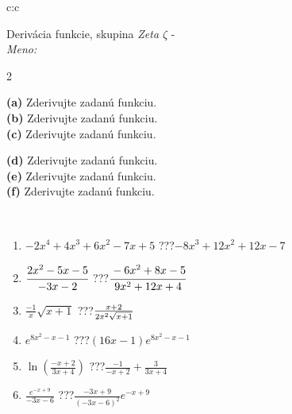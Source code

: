 \documentclass[10pt]{report}
\begin{document}
\newpage
\thispagestyle{empty}
\begin{tabular}{c:c}
\begin{minipage}[c][104.5mm][t]{0.5\linewidth}
\begin{center}
\vspace{7mm}
{\huge Derivácia funkcie, skupina \textit{Zeta $\zeta$} -}\\[5mm]
\textit{Meno:}\phantom{xxxxxxxxxxxxxxxxxxxxxxxxxxxxxxxxxxxxxxxxxxxxxxxxxxxxxxxxxxxxxxxxx}\\[5mm]
\begin{minipage}{0.95\linewidth}
\begin{center}
{\small \begin{multicols}{2} \raggedright
\textbf{(a)} Zderivujte zadanú funkciu. \\[1mm]
\textbf{(b)} Zderivujte zadanú funkciu. \\[1mm]
\textbf{(c)} Zderivujte zadanú funkciu. \par \columnbreak
\textbf{(d)} Zderivujte zadanú funkciu. \\[1mm]
\textbf{(e)} Zderivujte zadanú funkciu. \\[1mm]
\textbf{(f)} Zderivujte zadanú funkciu.
\end{multicols}
}
\end{center}
\end{minipage}
\\[4mm]
\begin{minipage}{0.79\linewidth}
\begin{center}
\begin{varwidth}{\linewidth}
\begin{enumerate}
\normalsize
\item $-2x^4+4x^3+6x^2-7x+5$\quad \dotfill\; ???\;\dotfill \quad $-8x^3+12x^2+12x-7$
\item $\cfrac{2x^2-5x-5}{-3x-2}$\quad \dotfill\; ???\;\dotfill \quad $\cfrac{-6x^2+8x-5}{9x^2+12x+4}$
\item $\frac{-1}{x}\sqrt{x+1}$\quad \dotfill\; ???\;\dotfill \quad $\frac{x+2}{2x^2 \sqrt{\smash[b]{x+1}}}$
\item $e^{8x^2-x-1}$\quad \dotfill\; ???\;\dotfill \quad $(16x-1)e^{8x^2-x-1}$
\item $\ln{\left(\frac{-x+2}{3x+4}\right)}$\quad \dotfill\; ???\;\dotfill \quad $\frac{-1}{-x+2}+\frac{3}{3x+4}$
\item $\frac{e^{-x+9}}{-3x-6}$\quad \dotfill\; ???\;\dotfill \quad $\frac{-3x+9}{(-3x-6)^2}e^{-x+9}$
\end{enumerate}

\end{varwidth}
\end{center}
\end{minipage}
\end{center}
\end{minipage}
\end{tabular}
\end{document}
